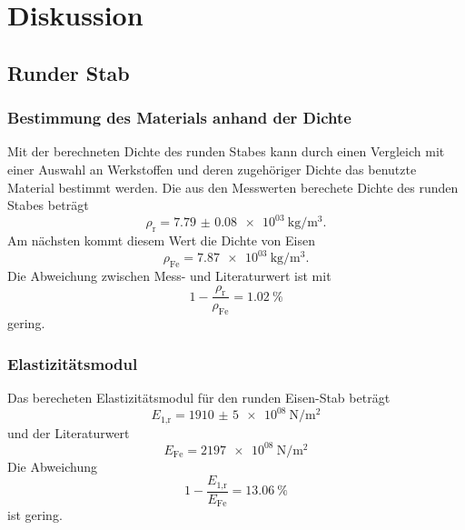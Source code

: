 \section{Diskussion}
\label{sec:Diskussion}

\subsection{Runder Stab}

\subsubsection{Bestimmung des Materials anhand der Dichte}

Mit der berechneten Dichte des runden Stabes kann durch einen
Vergleich mit einer Auswahl an Werkstoffen und deren zugehöriger
Dichte \cite{Metallwerte} das benutzte Material bestimmt werden.
Die aus den Messwerten berechete Dichte des runden Stabes beträgt
\begin{equation}
  \rho_\text{r} = \SI{7.79(8)e03}{\kilo\gram\per\cubic\meter}.
\end{equation}
Am nächsten kommt diesem Wert die Dichte von Eisen \cite{Metallwerte}
\begin{equation}
  \rho_\text{Fe} = \SI{7.87e03}{\kilo\gram\per\cubic\meter}.
\end{equation}
Die Abweichung zwischen Mess- und Literaturwert ist mit
\begin{equation}
  1-\frac{\rho_\text{r}}{\rho_\text{Fe}} = \SI{1.02}{\percent}
\end{equation}
gering.

\subsubsection{Elastizitätsmodul}

Das berecheten Elastizitätsmodul für den runden Eisen-Stab beträgt
\begin{equation}
  E_\text{1,r} = \SI{1910(5)e08}{\newton\per\meter\squared}
\end{equation}
und der Literaturwert \cite{Metallwerte}
\begin{equation}
  E_\text{Fe} = \SI{2197e08}{\newton\per\meter\squared}
\end{equation}
Die Abweichung
\begin{equation}
  1-\frac{E_\text{1,r}}{E_\text{Fe}} = \SI{13.06}{\percent}
\end{equation}
ist gering.

